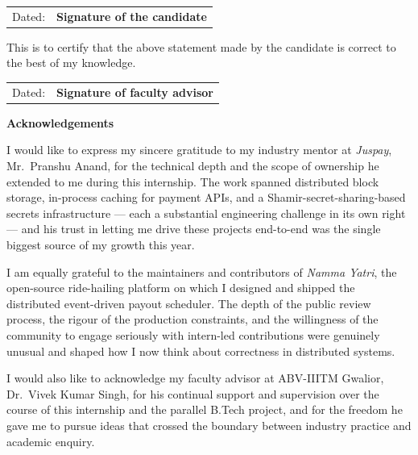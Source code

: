 \documentclass[12pt,a4paper,oneside]{report}
\begin{document}
\vspace{1cm}
\begin{center}
\begin{tabular}{p{}p{}}
Dated:  & {\bf{Signature of the candidate}} \\
\end{tabular}
\end{center}

\vspace{1.5cm}
\noindent This is to certify that the above statement made by the candidate is correct to the best of my knowledge.

\vspace{1.5cm}
\begin{center}
\begin{tabular}{p{}p{}}
Dated: & {\bf{Signature of faculty advisor}} \\
\end{tabular}
\end{center}
\clearpage

\thispagestyle{empty}
\begin{center}
{\LARGE \bf Acknowledgements}
\end{center}
\noindent
I would like to express my sincere gratitude to my industry mentor at \emph{Juspay}, Mr.\ Pranshu Anand, for the technical depth and the scope of ownership he extended to me during this internship. The work spanned distributed block storage, in-process caching for payment APIs, and a Shamir-secret-sharing-based secrets infrastructure --- each a substantial engineering challenge in its own right --- and his trust in letting me drive these projects end-to-end was the single biggest source of my growth this year.

I am equally grateful to the maintainers and contributors of \emph{Namma Yatri}, the open-source ride-hailing platform on which I designed and shipped the distributed event-driven payout scheduler. The depth of the public review process, the rigour of the production constraints, and the willingness of the community to engage seriously with intern-led contributions were genuinely unusual and shaped how I now think about correctness in distributed systems.

I would also like to acknowledge my faculty advisor at ABV-IIITM Gwalior, Dr.\ Vivek Kumar Singh, for his continual support and supervision over the course of this internship and the parallel B.Tech project, and for the freedom he gave me to pursue ideas that crossed the boundary between industry practice and academic enquiry.
\end{document}
